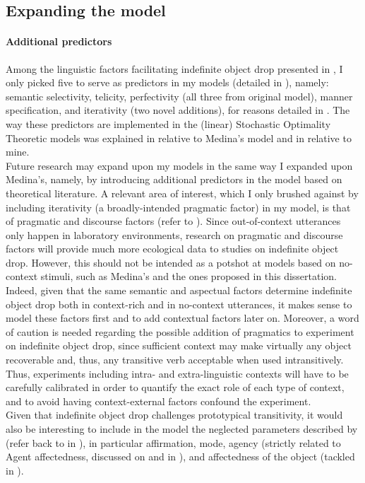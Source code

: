 \subsection{Expanding the model} 

\paragraph{Additional predictors}

Among the linguistic factors facilitating indefinite object drop presented in , I only picked five to serve as predictors in my models (detailed in ), namely: semantic selectivity, telicity, perfectivity (all three from  original model), manner specification, and iterativity (two novel additions), for reasons detailed in . The way these predictors are implemented in the (linear) Stochastic Optimality Theoretic models was explained in  relative to Medina's model and in  relative to mine.\\
Future research may expand upon my models in the same way I expanded upon Medina's, namely, by introducing additional predictors in the model based on theoretical literature. A relevant area of interest, which I only brushed against by including iterativity (a broadly-intended pragmatic factor) in my model, is that of pragmatic and discourse factors (refer to ). Since out-of-context utterances only happen in laboratory environments, research on pragmatic and discourse factors will provide much more ecological data to studies on indefinite object drop. However, this should not be intended as a potshot at models based on no-context stimuli, such as Medina's and the ones proposed in this dissertation. Indeed, given that the same semantic and aspectual factors determine indefinite object drop both in context-rich and in no-context utterances, it makes sense to model these factors first and to add contextual factors later on. Moreover, a word of caution is needed regarding the possible addition of pragmatics to experiment on indefinite object drop, since sufficient context may make virtually any object recoverable and, thus, any transitive verb acceptable when used intransitively. Thus, experiments including intra- and extra-linguistic contexts will have to be carefully calibrated in order to quantify the exact role of each type of context, and to avoid having context-external factors confound the experiment.\\
Given that indefinite object drop challenges prototypical transitivity, it would also be interesting to include in the model the neglected parameters described by \textcite{HopperThompson1980} (refer back to  in ), in particular affirmation, mode, agency (strictly related to Agent affectedness, discussed on  and in ), and affectedness of the object (tackled in ).

